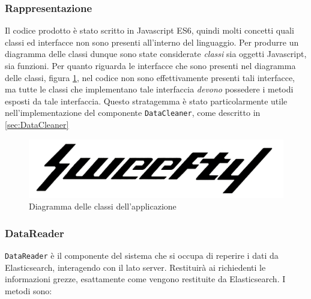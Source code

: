 \subsubsection{Rappresentazione}
Il codice prodotto è stato scritto in Javascript ES6, quindi molti concetti quali classi ed interfacce non sono presenti all'interno del linguaggio. Per produrre un diagramma delle classi dunque sono state considerate \emph{ classi } sia oggetti Javascript, sia funzioni. Per quanto riguarda le interfacce che sono presenti nel diagramma delle classi, figura \ref{img:diagrammaClassiClient}, nel codice non sono effettivamente presenti tali interfacce, ma tutte le classi che implementano tale interfaccia \emph{devono} possedere i metodi esposti da tale interfaccia. Questo stratagemma è stato particolarmente utile nell'implementazione del componente \texttt{DataCleaner}, come descritto in \ref{sec:DataCleaner}

\begin{figure}[H]
    \centering
    \includegraphics[width=1\textwidth]{Images/logo.jpg}
    \caption{Diagramma delle classi dell'applicazione}
    \label{img:diagrammaClassiClient}
\end{figure}

\subsubsection{DataReader}
\label{sec:DataReader}
\texttt{DataReader} è il componente del sistema che si occupa di reperire i dati da Elasticsearch, interagendo con il lato server. Restituirà ai richiedenti le informazioni grezze, esattamente come vengono restituite da Elasticsearch. I metodi sono:

